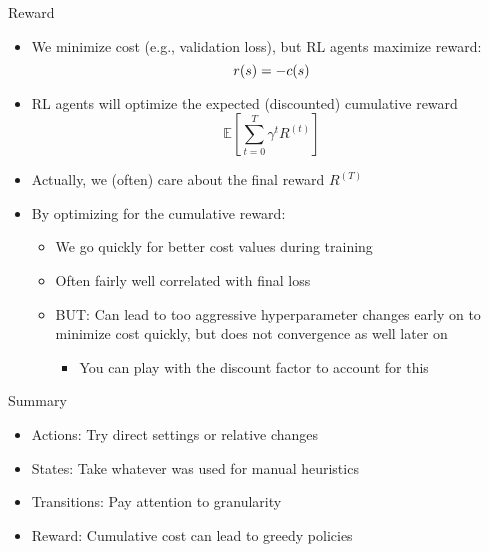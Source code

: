 \begin{frame}[c]{Reward}
	
	\begin{itemize}
	    \item We minimize cost (e.g., validation loss), but RL agents maximize reward:
	    $$r(s) = - c(s) $$
	    
	    \item RL agents will optimize the expected (discounted) cumulative reward 
	    $$ \mathbb{E} \left[\sum^T_{t=0} \gamma^{t}R^{(t)} \right]$$
	    \item Actually, we (often) care about the final reward $R^{(T)}$
	    \item By optimizing for the cumulative reward:
	    \begin{itemize}
	        \item We go quickly for better cost values during training
	        \item Often fairly well correlated with final loss
	        \item BUT: Can lead to too aggressive hyperparameter changes early on to minimize cost quickly, but does not convergence as well later on
	        \begin{itemize}
	            \item You can play with the discount factor to account for this
	        \end{itemize} 
	    \end{itemize}
	\end{itemize}
	
\end{frame}
\begin{frame}[c]{Summary}
	
	\begin{itemize}
	    \item Actions: Try direct settings or relative changes
	    \item States: Take whatever was used for manual heuristics
	    \item Transitions: Pay attention to granularity
	    \item Reward: Cumulative cost can lead to greedy policies
	\end{itemize}
	
\end{frame}

